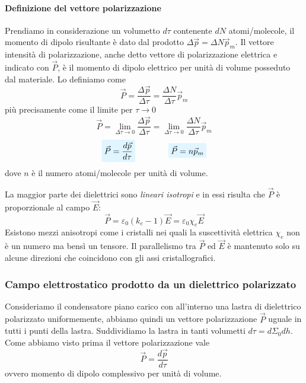 \documentclass[x11names]{report}
\begin{document}
\paragraph*{Definizione del vettore polarizzazione}
Prendiamo in considerazione un volumetto \(d\tau\) contenente \(dN\) atomi/molecole, il momento di dipolo risultante è dato dal prodotto \(\Delta\vec{p} = \Delta N \vec{p}_m\).  Il vettore intensità di polarizzazione, anche detto vettore di polarizzazione elettrica e indicato con \(\vec{P}\), è il momento di dipolo elettrico per unità di volume posseduto dal materiale. Lo definiamo come
\[
\vec{P} =\frac{\Delta \vec{p}}{\Delta\tau} = \frac{\Delta N}{\Delta \tau}\vec{p}_m
\]
più precisamente come il limite per \(\tau \to 0\)
\[
\vec{P} = \lim_{\Delta\tau\to 0}\frac{\Delta \vec{p}}{\Delta\tau} = \lim_{\Delta\tau\to 0}\frac{\Delta N}{\Delta \tau}\vec{p}_m
\]
\begin{equation}
\viola{\vec{P}= \frac{d \vec{p}}{d\tau}} \qquad \qquad	\viola{\vec{P} = n\vec{p}_m}
\end{equation}
dove \(n\) è il numero atomi/molecole per unità di volume. 


La maggior parte dei dielettrici sono \textit{lineari isotropi} e in essi risulta che \(\vec{P}\) è proporzionale al campo \(\vec{E}\):
\[
\vec{P} = \varepsilon_0(k_e -1)\vec{E} = \varepsilon_0 \chi_e \vec{E}
\]
Esistono mezzi anisotropi come i cristalli nei quali la suscettività elettrica \(\chi_e\) non è un numero ma bensì un tensore. Il parallelismo tra \(\vec{P}\) ed \(\vec{E}\) è mantenuto solo su alcune direzioni che coincidono con gli assi cristallografici.

\subsubsection{Campo elettrostatico prodotto da un dielettrico polarizzato}
Consideriamo il condensatore piano carico con all'interno una lastra di dielettrico polarizzato uniformemente, abbiamo quindi un vettore polarizzazione \(\vec{P}\) uguale in tutti i punti della lastra. Suddividiamo la lastra in tanti volumetti \(d\tau = d\Sigma_0 dh\). Come abbiamo visto prima il vettore polarizzazione vale
\[
\vec{P} = \frac{d\vec{p}}{d\tau}
\]
ovvero momento di dipolo complessivo per unità di volume.
\end{document}
